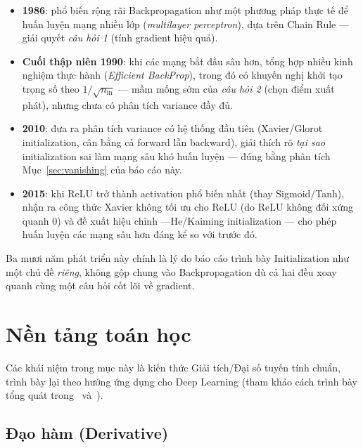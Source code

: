 \documentclass[12pt,a4paper]{article}
\newcommand{\en}[1]{\textit{#1}}
\begin{document}
\begin{itemize}
\item \textbf{1986}: \citet{rumelhart1986learning} phổ biến rộng rãi
  Backpropagation như một phương pháp thực tế để huấn luyện mạng nhiều
  lớp (\en{multilayer perceptron}), dựa trên Chain Rule --- giải quyết
  \emph{câu hỏi 1} (tính gradient hiệu quả).
\item \textbf{Cuối thập niên 1990}: khi các mạng bắt đầu sâu hơn,
  \citet{lecun1998efficient} tổng hợp nhiều kinh nghiệm thực hành
  (\en{Efficient BackProp}), trong đó có khuyến nghị khởi tạo trọng số
  theo $1/\sqrt{n_{\text{in}}}$ --- mầm mống sớm của \emph{câu hỏi 2}
  (chọn điểm xuất phát), nhưng chưa có phân tích variance đầy đủ.
\item \textbf{2010}: \citet{glorot2010understanding} đưa ra phân tích
  variance có hệ thống đầu tiên (Xavier/Glorot initialization, cân bằng
  cả forward lẫn backward), giải thích rõ \emph{tại sao} initialization
  sai làm mạng sâu khó huấn luyện --- đúng bằng phân tích
  Mục~\ref{sec:vanishing} của báo cáo này.
\item \textbf{2015}: khi ReLU trở thành activation phổ biến nhất (thay
  Sigmoid/Tanh), \citet{he2015delving} nhận ra công thức Xavier không tối
  ưu cho ReLU (do ReLU không đối xứng quanh $0$) và đề xuất hiệu chỉnh
  ---He/Kaiming initialization --- cho phép huấn luyện các mạng sâu hơn
  đáng kể so với trước đó.
\end{itemize}

Ba mươi năm phát triển này chính là lý do báo cáo trình bày Initialization
như một chủ đề \emph{riêng}, không gộp chung vào Backpropagation dù cả
hai đều xoay quanh cùng một câu hỏi cốt lõi về gradient.

\section{Nền tảng toán học}

Các khái niệm trong mục này là kiến thức Giải tích/Đại số tuyến tính chuẩn,
trình bày lại theo hướng ứng dụng cho Deep Learning (tham khảo cách trình
bày tổng quát trong~\citet{bishop2006pattern} và~\citet{goodfellow2016deep}).

\subsection{Đạo hàm (Derivative)}
\end{document}
